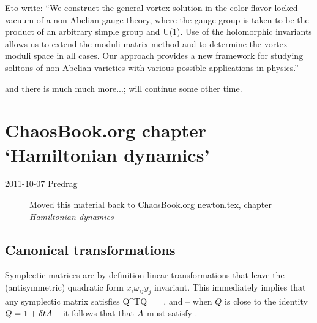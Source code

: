 \begin{description}
Eto \etal{} write:
   ``We construct the general vortex solution in the color-flavor-locked
   vacuum of a non-Abelian gauge theory, where the gauge group is taken
   to be the product of an arbitrary simple group and U(1). Use of the
   holomorphic invariants allows us to extend the moduli-matrix method
   and to determine the vortex moduli space in all cases. Our approach
   provides a new framework for studying solitons of non-Abelian
   varieties with various possible applications in physics.''

and there is much much more...; will continue some other time.

\end{description}


\section{ChaosBook.org chapter `Hamiltonian dynamics'}
\label{sect:toCB}

\begin{description}
\item[2011-10-07 Predrag]
Moved this material back to ChaosBook.org newton.tex,
chapter {\em Hamiltonian dynamics}

\end{description}


\subsection{Canonical transformations}
\label{sect:CanonTransf}

Symplectic matrices are by definition linear transformations that
leave the (antisymmetric) quadratic form $x_i \omega_{ij} y_j$ invariant. This
immediately implies that any symplectic matrix satisfies
\beq
Q^T\omega Q \,=\, \omega
\,,
\label{sympQ}
\eeq
and -- when $Q$ is close to the identity $Q={\bf 1} + \delta t A$ --
it follows that
that $A$ must satisfy .

\renewcommand{\LieEl}{\ensuremath{\gamma}}  %
\renewcommand{\ssp}{a}
